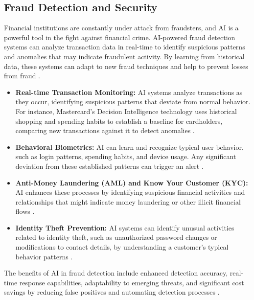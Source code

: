 \subsection{Fraud Detection and Security}
Financial institutions are constantly under attack from fraudsters, and AI is a powerful tool in the fight against financial crime. AI-powered fraud detection systems can analyze transaction data in real-time to identify suspicious patterns and anomalies that may indicate fraudulent activity. By learning from historical data, these systems can adapt to new fraud techniques and help to prevent losses from fraud \cite{fma2024understanding}.
\begin{itemize}
    \item \textbf{Real-time Transaction Monitoring:} AI systems analyze transactions as they occur, identifying suspicious patterns that deviate from normal behavior. For instance, Mastercard's Decision Intelligence technology uses historical shopping and spending habits to establish a baseline for cardholders, comparing new transactions against it to detect anomalies \cite{SmartDev_FraudDetection, CIOCoverage_FraudDetection}.
    \item \textbf{Behavioral Biometrics:} AI can learn and recognize typical user behavior, such as login patterns, spending habits, and device usage. Any significant deviation from these established patterns can trigger an alert \cite{InfosysBPM_FraudDetection, Experian_FraudDetection}.
    \item \textbf{Anti-Money Laundering (AML) and Know Your Customer (KYC):} AI enhances these processes by identifying suspicious financial activities and relationships that might indicate money laundering or other illicit financial flows \cite{DataDome_FraudDetection, Cognizant_FraudDetection}.
    \item \textbf{Identity Theft Prevention:} AI systems can identify unusual activities related to identity theft, such as unauthorized password changes or modifications to contact details, by understanding a customer's typical behavior patterns \cite{IBM_FraudDetection}.
\end{itemize}
The benefits of AI in fraud detection include enhanced detection accuracy, real-time response capabilities, adaptability to emerging threats, and significant cost savings by reducing false positives and automating detection processes \cite{Adviters_FraudDetection, Nvidia_FraudDetection}.

